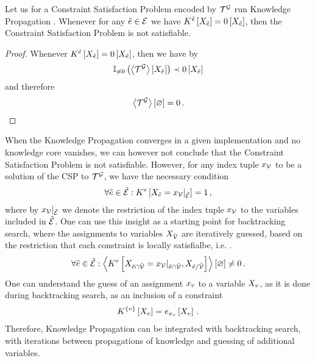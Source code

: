 \begin{corollary}
	Let us for a Constraint Satisfaction Problem encoded by $\mathcal{T}^{\mathcal{G}}$ run Knowledge Propagation .
	Whenever for any $\tilde{e}\in\mathcal{E}$ we have $K^{\tilde{e}}\left[X_{\tilde{e}}\right]=0\left[X_{\tilde{e}}\right]$, then the Constraint Satisfaction Problem is not satisfiable.
\end{corollary}
\begin{proof}
	Whenever $K^{\tilde{e}}\left[X_{\tilde{e}}\right]=0\left[X_{\tilde{e}}\right]$, then we have by 
	\begin{align*}
		\mathbb{I}_{\neq0}\left(\left\langle \mathcal{T}^{\mathcal{G}}\right\rangle \left[ X_{\tilde{e}} \right]\right) \prec 0\left[X_{\tilde{e}}\right]
	\end{align*}
	and therefore
	\begin{align*}
		\left\langle \mathcal{T}^{\mathcal{G}}\right\rangle \left[ \varnothing \right] = 0 \, .
	\end{align*}
\end{proof}

When the Knowledge Propagation  converges in a given implementation and no knowledge core vanishes, we can however not conclude that the Constraint Satisfaction Problem is not satisfiable.
However, for any index tuple $x_{\mathcal{V}}$ to be a solution of the CSP to $\mathcal{T}^{\mathcal{G}}$, we have the necessary condition
\begin{align*}
	\forall{\tilde{e}\in\tilde{\mathcal{E}}}:{K^{e}\left[X_{\tilde{e}}={x_{\mathcal{V}}}|_{\tilde{\mathcal{E}}}\right]=1} \, ,
\end{align*}
where by ${x_{\mathcal{V}}}|_{\tilde{\mathcal{E}}}$ we denote the restriction of the index tuple $x_{\mathcal{V}}$ to the variables included in $\tilde{\mathcal{E}}$.
One can use this insight as a starting point for backtracking search, where the assignments to variables $X_{\tilde{\mathcal{V}}}$ are iteratively guessed, based on the restriction that each constraint is locally satisfialbe, i.e. .
\begin{align*}
	\forall{\tilde{e}\in\tilde{\mathcal{E}}}:{
		\left\langle K^{e}\left[
			X_{\tilde{e}\cap\tilde{\mathcal{V}}}={x_{\mathcal{V}}}|_{\tilde{e}\cap\tilde{\mathcal{V}}}
			,X_{\tilde{e}/\tilde{\mathcal{V}}}\right]\right\rangle \left[ \varnothing \right] \neq 0
	} \, .
\end{align*}
One can understand the guess of an assignment $x_{v}$ to a variable $X_{v}$, as it is done during backtracking search, as an inclusion of a constraint
\begin{align*}
	K^{\{v\}}\left[X_{v}\right]
	= e_{x_{v}}\left[X_{v}\right] \, .
\end{align*}
Therefore, Knowledge Propagation  can be integrated with backtracking search, with iterations between propagations of knowledge and guessing of additional variables.



